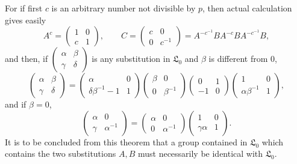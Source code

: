 \documentclass[11pt]{article}
\newcommand{\Lzero}{\mathfrak L_0}
\begin{document}
For if first $c$ is an arbitrary number not divisible by $p$, then actual calculation gives easily
\begin{equation}
 A^c=\begin{pmatrix}1&0\\ c&1\end{pmatrix},
 \qquad
 C=\begin{pmatrix}c&0\\0&c^{-1}\end{pmatrix}
 =A^{-c^{-1}}BA^{-c}BA^{-c^{-1}}B,
\tag{11}
\end{equation}
and then, if $\begin{pmatrix}\alpha&\beta\\\gamma&\delta\end{pmatrix}$ is any substitution in $\Lzero$ and $\beta$ is different from $0$,
\begin{equation}
 \begin{pmatrix}\alpha&\beta\\\gamma&\delta\end{pmatrix}
 =\begin{pmatrix}\alpha&0\\ \delta\beta^{-1}-1&1\end{pmatrix}
 \begin{pmatrix}\beta&0\\0&\beta^{-1}\end{pmatrix}
 \begin{pmatrix}0&1\\-1&0\end{pmatrix}
 \begin{pmatrix}1&0\\ \alpha\beta^{-1}&1\end{pmatrix},
\tag{12}
\end{equation}
and if $\beta=0$,
\begin{equation}
 \begin{pmatrix}\alpha&0\\\gamma&\alpha^{-1}\end{pmatrix}
 =\begin{pmatrix}\alpha&0\\0&\alpha^{-1}\end{pmatrix}
 \begin{pmatrix}1&0\\\gamma\alpha&1\end{pmatrix}.
\tag{13}
\end{equation}
It is to be concluded from this theorem that a group contained in $\Lzero$ which contains the two substitutions $A,B$ must necessarily be identical with $\Lzero$.
\end{document}
